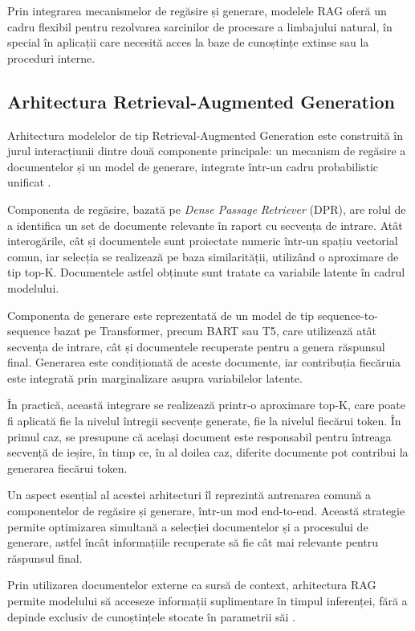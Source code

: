 \documentclass[12pt, a4paper, oneside, romanian]{teza-upb}
\begin{document}
Prin integrarea mecanismelor de regăsire și generare, modelele RAG oferă un cadru flexibil pentru rezolvarea sarcinilor de procesare a limbajului natural, în special în aplicații care necesită acces la baze de cunoștințe extinse \cite{lewis2020retrieval} sau la proceduri interne.


\subsection{Arhitectura Retrieval-Augmented Generation}

Arhitectura modelelor de tip Retrieval-Augmented Generation este construită în jurul interacțiunii dintre două componente principale: un mecanism de regăsire a documentelor și un model de generare, integrate într-un cadru probabilistic unificat \cite{lewis2020retrieval}.

Componenta de regăsire, bazată pe \textit{Dense Passage Retriever} (DPR), are rolul de a identifica un set de documente relevante în raport cu secvența de intrare. Atât interogările, cât și documentele sunt proiectate numeric într-un spațiu vectorial comun, iar selecția se realizează pe baza similarității, utilizând o aproximare de tip top-K. Documentele astfel obținute sunt tratate ca variabile latente în cadrul modelului.

Componenta de generare este reprezentată de un model de tip sequence-to-sequence bazat pe Transformer, precum BART sau T5, care utilizează atât secvența de intrare, cât și documentele recuperate pentru a genera răspunsul final. Generarea este condiționată de aceste documente, iar contribuția fiecăruia este integrată prin marginalizare asupra variabilelor latente.

În practică, această integrare se realizează printr-o aproximare top-K, care poate fi aplicată fie la nivelul întregii secvențe generate, fie la nivelul fiecărui token. În primul caz, se presupune că același document este responsabil pentru întreaga secvență de ieșire, în timp ce, în al doilea caz, diferite documente pot contribui la generarea fiecărui token.

Un aspect esențial al acestei arhitecturi îl reprezintă antrenarea comună a componentelor de regăsire și generare, într-un mod end-to-end. Această strategie permite optimizarea simultană a selecției documentelor și a procesului de generare, astfel încât informațiile recuperate să fie cât mai relevante pentru răspunsul final.

Prin utilizarea documentelor externe ca sursă de context, arhitectura RAG permite modelului să acceseze informații suplimentare în timpul inferenței, fără a depinde exclusiv de cunoștințele stocate în parametrii săi \cite{lewis2020retrieval}.
\end{document}
